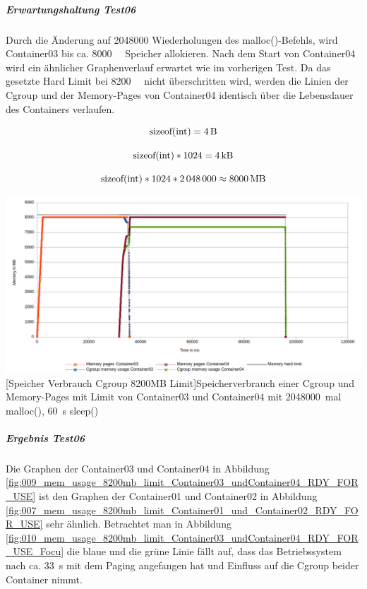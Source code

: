 \vspace{1em}


\subparagraph{Erwartungshaltung Test06}
Durch die Änderung auf \SI{2048000}{} Wiederholungen des malloc()-Befehls, wird Container03 bis ca. \SI{8000}{\mega\byte} Speicher allokieren. Nach dem Start von Container04 wird ein ähnlicher Graphenverlauf erwartet wie im vorherigen Test. Da das gesetzte Hard Limit bei \SI{8200}{\mega\byte} nicht überschritten wird, werden die Linien der Cgroup und der Memory-Pages von Container04 identisch über die Lebensdauer des Containers verlaufen.

\[\mathrm{sizeof(int)} = \SI{4}{\byte}\]

\[\mathrm{sizeof(int)} * \SI{1024}{} = \SI{4}{\kilo\byte}\]

\[\mathrm{sizeof(int)} * \SI{1024}{} * \SI{2048000}{} \approx \SI{8000}{\mega\byte} \]

\vspace{1em}
\begin{minipage}{\linewidth}
	\centering
	\includegraphics[width=1\linewidth]{pics/009_mem_usage_8200mb_limit_Container03_undContainer04_RDY_FOR_USE.png}
	[Speicher Verbrauch Cgroup 8200MB Limit]{Speicherverbrauch einer Cgroup und Memory-Pages mit Limit von Container03 und Container04 mit \SI{2048000}{mal} malloc(), \SI{60}{\second} sleep()}
	\label{fig:009_mem_usage_8200mb_limit_Container03_undContainer04_RDY_FOR_USE}
\end{minipage}

\subparagraph{Ergebnis Test06}
Die Graphen der Container03 und Container04 in Abbildung \ref{fig:009_mem_usage_8200mb_limit_Container03_undContainer04_RDY_FOR_USE} ist den Graphen der Container01 und Container02 in Abbildung \ref{fig:007_mem_usage_8200mb_limit_Container01_und_Container02_RDY_FOR_USE} sehr ähnlich. Betrachtet man in Abbildung \ref{fig:010_mem_usage_8200mb_limit_Container03_undContainer04_RDY_FOR_USE_Focu} die blaue und die grüne Linie fällt auf, dass das Betriebssystem nach ca. \SI{33}{\second} mit dem Paging angefangen hat und Einfluss auf die Cgroup beider Container nimmt.  

